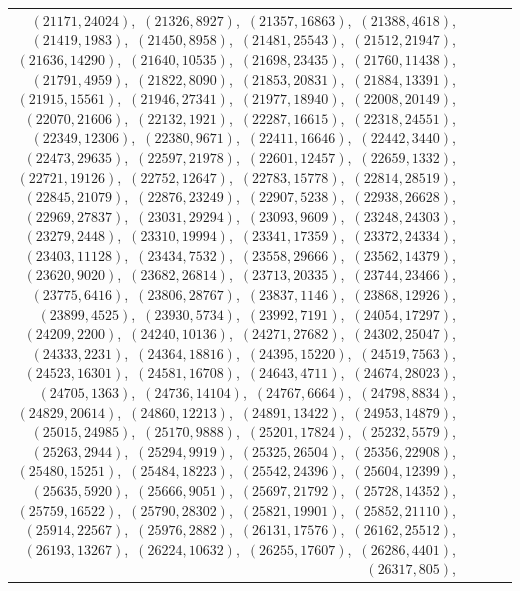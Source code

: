 \documentclass[11pt]{article}
\begin{document}
\begin{longtable}{@{}rrl>{\raggedright\arraybackslash}p{}@{}}
$(21171,24024)$,\allowbreak\ $(21326,8927)$,\allowbreak\ $(21357,16863)$,\allowbreak\ $(21388,4618)$,\allowbreak\ $(21419,1983)$,\allowbreak\ $(21450,8958)$,\allowbreak\ $(21481,25543)$,\allowbreak\ $(21512,21947)$,\allowbreak\ $(21636,14290)$,\allowbreak\ $(21640,10535)$,\allowbreak\ $(21698,23435)$,\allowbreak\ $(21760,11438)$,\allowbreak\ $(21791,4959)$,\allowbreak\ $(21822,8090)$,\allowbreak\ $(21853,20831)$,\allowbreak\ $(21884,13391)$,\allowbreak\ $(21915,15561)$,\allowbreak\ $(21946,27341)$,\allowbreak\ $(21977,18940)$,\allowbreak\ $(22008,20149)$,\allowbreak\ $(22070,21606)$,\allowbreak\ $(22132,1921)$,\allowbreak\ $(22287,16615)$,\allowbreak\ $(22318,24551)$,\allowbreak\ $(22349,12306)$,\allowbreak\ $(22380,9671)$,\allowbreak\ $(22411,16646)$,\allowbreak\ $(22442,3440)$,\allowbreak\ $(22473,29635)$,\allowbreak\ $(22597,21978)$,\allowbreak\ $(22601,12457)$,\allowbreak\ $(22659,1332)$,\allowbreak\ $(22721,19126)$,\allowbreak\ $(22752,12647)$,\allowbreak\ $(22783,15778)$,\allowbreak\ $(22814,28519)$,\allowbreak\ $(22845,21079)$,\allowbreak\ $(22876,23249)$,\allowbreak\ $(22907,5238)$,\allowbreak\ $(22938,26628)$,\allowbreak\ $(22969,27837)$,\allowbreak\ $(23031,29294)$,\allowbreak\ $(23093,9609)$,\allowbreak\ $(23248,24303)$,\allowbreak\ $(23279,2448)$,\allowbreak\ $(23310,19994)$,\allowbreak\ $(23341,17359)$,\allowbreak\ $(23372,24334)$,\allowbreak\ $(23403,11128)$,\allowbreak\ $(23434,7532)$,\allowbreak\ $(23558,29666)$,\allowbreak\ $(23562,14379)$,\allowbreak\ $(23620,9020)$,\allowbreak\ $(23682,26814)$,\allowbreak\ $(23713,20335)$,\allowbreak\ $(23744,23466)$,\allowbreak\ $(23775,6416)$,\allowbreak\ $(23806,28767)$,\allowbreak\ $(23837,1146)$,\allowbreak\ $(23868,12926)$,\allowbreak\ $(23899,4525)$,\allowbreak\ $(23930,5734)$,\allowbreak\ $(23992,7191)$,\allowbreak\ $(24054,17297)$,\allowbreak\ $(24209,2200)$,\allowbreak\ $(24240,10136)$,\allowbreak\ $(24271,27682)$,\allowbreak\ $(24302,25047)$,\allowbreak\ $(24333,2231)$,\allowbreak\ $(24364,18816)$,\allowbreak\ $(24395,15220)$,\allowbreak\ $(24519,7563)$,\allowbreak\ $(24523,16301)$,\allowbreak\ $(24581,16708)$,\allowbreak\ $(24643,4711)$,\allowbreak\ $(24674,28023)$,\allowbreak\ $(24705,1363)$,\allowbreak\ $(24736,14104)$,\allowbreak\ $(24767,6664)$,\allowbreak\ $(24798,8834)$,\allowbreak\ $(24829,20614)$,\allowbreak\ $(24860,12213)$,\allowbreak\ $(24891,13422)$,\allowbreak\ $(24953,14879)$,\allowbreak\ $(25015,24985)$,\allowbreak\ $(25170,9888)$,\allowbreak\ $(25201,17824)$,\allowbreak\ $(25232,5579)$,\allowbreak\ $(25263,2944)$,\allowbreak\ $(25294,9919)$,\allowbreak\ $(25325,26504)$,\allowbreak\ $(25356,22908)$,\allowbreak\ $(25480,15251)$,\allowbreak\ $(25484,18223)$,\allowbreak\ $(25542,24396)$,\allowbreak\ $(25604,12399)$,\allowbreak\ $(25635,5920)$,\allowbreak\ $(25666,9051)$,\allowbreak\ $(25697,21792)$,\allowbreak\ $(25728,14352)$,\allowbreak\ $(25759,16522)$,\allowbreak\ $(25790,28302)$,\allowbreak\ $(25821,19901)$,\allowbreak\ $(25852,21110)$,\allowbreak\ $(25914,22567)$,\allowbreak\ $(25976,2882)$,\allowbreak\ $(26131,17576)$,\allowbreak\ $(26162,25512)$,\allowbreak\ $(26193,13267)$,\allowbreak\ $(26224,10632)$,\allowbreak\ $(26255,17607)$,\allowbreak\ $(26286,4401)$,\allowbreak\ $(26317,805)$,\allowbreak\ 
\end{longtable}
\end{document}
